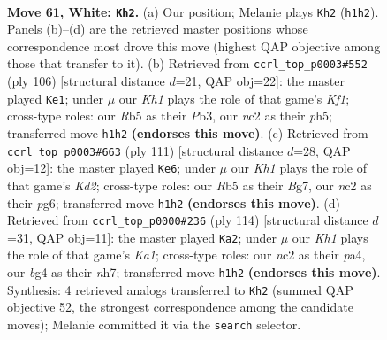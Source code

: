 \documentclass[11pt]{article}
\begin{document}
\clearpage

\begin{figure}[p]\centering
\begin{subfigure}{0.46\textwidth}\centering
\resizebox{\linewidth}{!}{%
\newchessgame
\chessboard[
  setfen={8/5k2/2r5/1R6/4r1bB/6R1/2n2P2/7K w - - 1 61},
  showmover=false,
  pgfstyle=straightmove, color=movearrow, markmove={h1-h2}
]}
\caption{}
\end{subfigure}\hfill
\begin{subfigure}{0.46\textwidth}\centering
\resizebox{\linewidth}{!}{%
\newchessgame
\chessboard[
  setfen={8/8/2Rb4/5k1p/B7/1P2P3/3r4/5K2 w - - 0 54},
  showmover=false,
  pgfstyle=straightmove, color=movearrow, markmove={f1-e1}
]}
\caption{}
\end{subfigure}
\\[4pt]
\begin{subfigure}{0.46\textwidth}\centering
\resizebox{\linewidth}{!}{%
\newchessgame
\chessboard[
  setfen={8/3k2b1/6P1/7p/8/R3BK2/8/4r3 b - - 0 56},
  showmover=false,
  pgfstyle=straightmove, color=movearrow, markmove={d7-e6}
]}
\caption{}
\end{subfigure}\hfill
\begin{subfigure}{0.46\textwidth}\centering
\resizebox{\linewidth}{!}{%
\newchessgame
\chessboard[
  setfen={8/5R1n/8/2k5/p7/7r/1P1B4/K7 w - - 0 58},
  showmover=false,
  pgfstyle=straightmove, color=movearrow, markmove={a1-a2}
]}
\caption{}
\end{subfigure}
\caption{\textbf{Move 61, White: \texttt{Kh2}.} (a) Our position; Melanie plays \texttt{Kh2} (\texttt{h1h2}). Panels (b)--(d) are the retrieved master positions whose correspondence most drove this move (highest QAP objective among those that transfer to it). (b) Retrieved from \texttt{ccrl\_top\_p0003\#552} (ply 106) [structural distance $d$=21, QAP obj=22]: the master played \texttt{Ke1}; under $\mu$ our \emph{Kh1} plays the role of that game's \emph{Kf1}; cross-type roles: our \emph{R}b5 as their \emph{P}b3, our \emph{n}c2 as their \emph{p}h5; transferred move \texttt{h1h2} \textbf{(endorses this move)}. (c) Retrieved from \texttt{ccrl\_top\_p0003\#663} (ply 111) [structural distance $d$=28, QAP obj=12]: the master played \texttt{Ke6}; under $\mu$ our \emph{Kh1} plays the role of that game's \emph{Kd2}; cross-type roles: our \emph{R}b5 as their \emph{B}g7, our \emph{n}c2 as their \emph{p}g6; transferred move \texttt{h1h2} \textbf{(endorses this move)}. (d) Retrieved from \texttt{ccrl\_top\_p0000\#236} (ply 114) [structural distance $d$=31, QAP obj=11]: the master played \texttt{Ka2}; under $\mu$ our \emph{Kh1} plays the role of that game's \emph{Ka1}; cross-type roles: our \emph{n}c2 as their \emph{p}a4, our \emph{b}g4 as their \emph{n}h7; transferred move \texttt{h1h2} \textbf{(endorses this move)}. Synthesis: 4 retrieved analogs transferred to \texttt{Kh2} (summed QAP objective 52, the strongest correspondence among the candidate moves); Melanie committed it via the \texttt{search} selector.}
\label{fig:thought-m120}
\end{figure}
\end{document}

